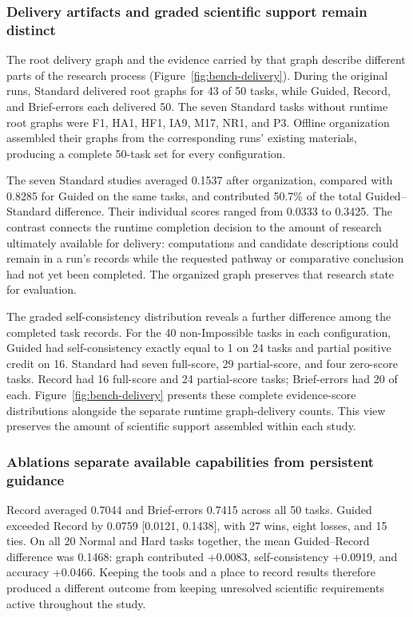 \subsubsection{Delivery artifacts and graded scientific support remain distinct}

The root delivery graph and the evidence carried by that graph describe different parts of the research process (Figure~\ref{fig:bench-delivery}). During the original runs, Standard delivered root graphs for 43 of 50 tasks, while Guided, Record, and Brief-errors each delivered 50. The seven Standard tasks without runtime root graphs were F1, HA1, HF1, IA9, M17, NR1, and P3. Offline organization assembled their graphs from the corresponding runs' existing materials, producing a complete 50-task set for every configuration.

The seven Standard studies averaged 0.1537 after organization, compared with 0.8285 for Guided on the same tasks, and contributed 50.7\% of the total Guided--Standard difference. Their individual scores ranged from 0.0333 to 0.3425. The contrast connects the runtime completion decision to the amount of research ultimately available for delivery: computations and candidate descriptions could remain in a run's records while the requested pathway or comparative conclusion had not yet been completed. The organized graph preserves that research state for evaluation.

\newpage

The graded self-consistency distribution reveals a further difference among the completed task records. For the 40 non-Impossible tasks in each configuration, Guided had self-consistency exactly equal to 1 on 24 tasks and partial positive credit on 16. Standard had seven full-score, 29 partial-score, and four zero-score tasks. Record had 16 full-score and 24 partial-score tasks; Brief-errors had 20 of each. Figure~\ref{fig:bench-delivery} presents these complete evidence-score distributions alongside the separate runtime graph-delivery counts. This view preserves the amount of scientific support assembled within each study.

\subsubsection{Ablations separate available capabilities from persistent guidance}

Record averaged 0.7044 and Brief-errors 0.7415 across all 50 tasks. Guided exceeded Record by 0.0759 [0.0121, 0.1438], with 27 wins, eight losses, and 15 ties. On all 20 Normal and Hard tasks together, the mean Guided--Record difference was 0.1468: graph contributed +0.0083, self-consistency +0.0919, and accuracy +0.0466. Keeping the tools and a place to record results therefore produced a different outcome from keeping unresolved scientific requirements active throughout the study.

